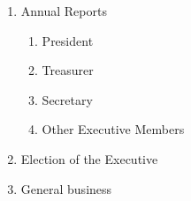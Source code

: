\documentclass[11pt]{article}
\begin{document}
\begin{enumerate}[\thesection .1]
\begin{enumerate}[\hspace{5mm}1.]
    	\item Annual Reports
    	\begin{enumerate}[\hspace{5mm}1.]
            \item President
            \item Treasurer
            \item Secretary
            \item Other Executive Members 
        \end{enumerate}
        \item Election of the Executive
        \item General business
    \end{enumerate}
\end{enumerate}
\end{document}
